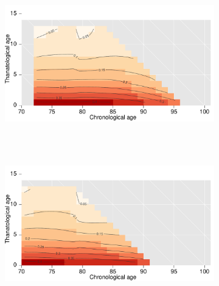 \documentclass[12pt,oneside,a4paper,doublespacing]{article} %
\theoremstyle{definition}
\begin{document}
\begin{figure}[h!]
\begin{subfigure}{.46\textwidth}
\centering
\caption{~}
\includegraphics[scale=0.32]{srhpoor1915.pdf}
\end{subfigure}
~
\begin{subfigure}{.46\textwidth}
\centering
\caption{~}
\includegraphics[scale=0.32]{srhpoor1920.pdf}
\end{subfigure}


\end{figure}
\end{document}
